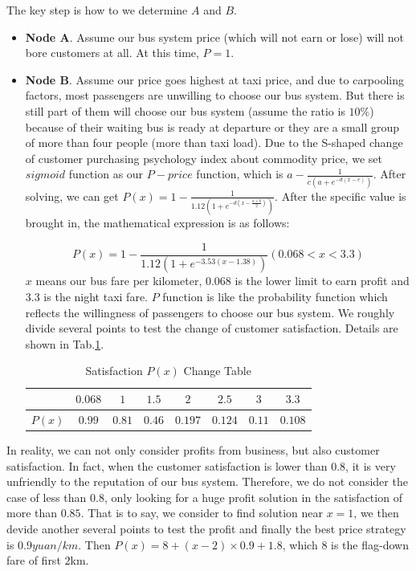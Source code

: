 \documentclass{llncs}
\begin{document}
The key step is how to we determine $A$ and $B$.
\begin{itemize}
	\item \textbf{Node A}. Assume our bus system price (which will not earn or lose) will not bore customers at all. At this time, $P=1$.
	
	\item \textbf{Node B}. Assume our price goes highest at taxi price, and due to carpooling factors, most passengers are unwilling to choose our bus system. But there is still part of them will choose our bus system (assume the ratio is $10\%$) because of their waiting bus is ready at departure or they are a small group of more than four people (more than taxi load). Due to the S-shaped change of customer purchasing psychology index about commodity price, we set $sigmoid$ function as our $P-price$ function, which is $a-\frac{1}{c(a+e^{-d(x-e)})}$. After solving, we can get $P(x) = 1-\frac{1}{1.12(1+e^{-d(x-\frac{a+b}{2})})}$. After the specific value is brought in, the mathematical expression is as follows:
	
	\begin{equation*}
		P(x) = 1-\frac{1}{1.12(1+e^{-3.53(x-1.38)})} (0.068 < x < 3.3)
	\end{equation*}
	$x$ means our bus fare per kilometer, $0.068$ is the lower limit to earn profit and $3.3$ is the night taxi fare. $P$ function is like the probability function which reflects the willingness of passengers to choose our bus system. We roughly divide several points to test the change of customer satisfaction. Details are shown in Tab.\ref{tab-pfunction}.
	
	 	\begin{table}[htbp]
	 				\caption{Satisfaction $P(x)$ Change Table}
		\begin{center}
			\begin{tabular}{|c|c|c|c|c|c|c|c|}
				\hline
				\diagbox[width=15em,trim=l]{Satisfaction}{fare($x$)} & $0.068$ & $1$ & $1.5$ & $2$ & $2.5$ & $3$ & $3.3$ \\
				\hline
				$P(x)$			& $0.99$ & $0.81$ & $0.46$ & $0.197$ & $0.124$ & $0.11$ & $0.108$\\
				\hline
			\end{tabular}
		\end{center}
		\label{tab-pfunction}
	\end{table}
\end{itemize}

In reality, we can not only consider profits from business, but also customer satisfaction. In fact, when the customer satisfaction is lower than $0.8$, it is very unfriendly to the reputation of our bus system. Therefore, we do not consider the case of less than $0.8$, only looking for a huge profit solution in the satisfaction of more than $0.85$. That is to say, we consider to find solution near $x=1$, we then devide another several points to test  the profit and finally the best price strategy is $0.9yuan/km$. Then $P(x) = 8 + (x-2)\times 0.9 + 1.8$, which $8$ is the flag-down fare of first $2$km.
\end{document}
